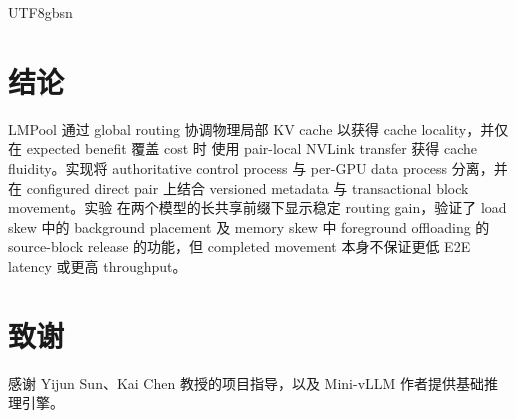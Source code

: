 \documentclass[11pt,a4paper]{article}
\newcommand{\sys}{LMPool}
\begin{document}
\begin{CJK*}{UTF8}{gbsn}
\section{结论}

\sys{} 通过 global routing 协调物理局部 KV cache 以获得 cache locality，并仅在 expected benefit 覆盖 cost 时
使用 pair-local NVLink transfer 获得 cache fluidity。实现将 authoritative control process 与 per-GPU data
process 分离，并在 configured direct pair 上结合 versioned metadata 与 transactional block movement。实验
在两个模型的长共享前缀下显示稳定 routing gain，验证了 load skew 中的 background placement 及 
memory skew 中 foreground offloading 的 source-block release 的功能，但 completed movement 本身不保证更低 E2E latency 或更高
throughput。

\section*{致谢}
感谢 Yijun Sun、Kai Chen 教授的项目指导，以及 Mini-vLLM 作者提供基础推理引擎。




\ifXeTeX\else\end{CJK*}\fi
\end{document}
